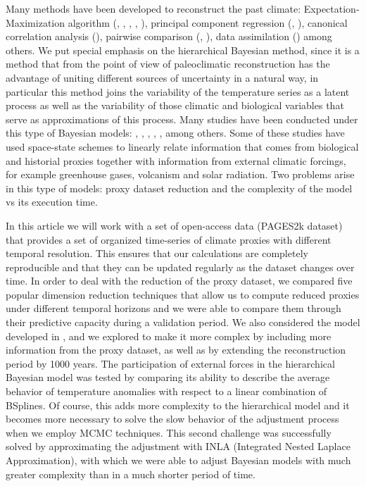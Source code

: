 \documentclass[11pt]{amsart}
\theoremstyle{plain}
\theoremstyle{definition}
\theoremstyle{remark}
\begin{document}
Many methods have been developed to reconstruct the past climate:
Expectation-Maximization algorithm (\cite{Schneider01,mann2005testing},
\cite{mann2007robust}, \cite{rutherford2003climate}, \cite{bradley2005proxy},
\cite{steig2009}), principal component regression
(\cite{luterbacher2004european}, \cite{Wahl2012}), canonical
correlation analysis (\cite{smerdon2010pseudoproxy}), pairwise comparison
(\cite{Hanhijarvi2013}, \cite{Gergis2016}), data assimilation (\cite{Hakim2016}) among
others. We put special emphasis on the hierarchical Bayesian method, since it is
a method that from the point of view of paleoclimatic reconstruction has the
advantage of uniting different sources of uncertainty in a natural way, in
particular this method joins the variability of the temperature series as a
latent process as well as the variability of those climatic and biological
variables that serve as approximations of this process. Many studies have been
conducted under this type of Bayesian models: \cite{boli1}, \cite{tingley1},
\cite{tingley2}, \cite{tingley2013_Ext}, \cite{werner2012pseudoproxy},
\cite{Barboza2014} among others. Some of these studies have used space-state
schemes to linearly relate information that comes from biological and historial
proxies together with information from external climatic forcings, for example
greenhouse gases, volcanism and solar radiation. Two problems arise in this
type of models: proxy dataset reduction and the complexity of the model vs its execution time.

In this article we will work with a set of open-access data (PAGES2k dataset)
that provides a set of organized time-series of climate proxies with different
temporal resolution. This ensures that our calculations are completely
reproducible and that they can be updated regularly as the dataset changes over
time. In order to deal with the reduction of the proxy dataset, we compared five
popular dimension reduction techniques that allow us to compute reduced proxies
under different temporal horizons and we were able to compare them through their
predictive capacity during a validation period. We also considered the model
developed in \cite{Barboza2014}, and we explored to make it more complex by
including more information from the proxy dataset, as well as by extending the
reconstruction period by 1000 years. The participation of external forces in the
hierarchical Bayesian model was tested by comparing its ability to describe the
average behavior of temperature anomalies with respect to a linear combination
of BSplines. Of course, this adds more complexity to the hierarchical model and
it becomes more necessary to solve the slow behavior of the adjustment process
when we employ MCMC techniques. This second challenge was successfully solved by
approximating the adjustment with INLA (Integrated Nested Laplace
Approximation), with which we were able to adjust Bayesian models with much
greater complexity than \cite{Barboza2014} in a much shorter period of time. 
\end{document}
